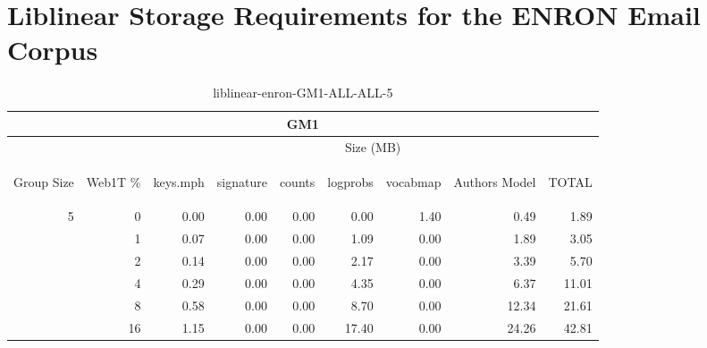 \chapter{Liblinear Storage Requirements for the ENRON Email Corpus}

\begin{center}
\begin{table}[htbp] 
 \begin{center}
\begin{tabular}{ | r | r | r | r | r | r | r | r | r |}
\hline
\multicolumn{9}{|c|}{GM1}\\
\hline
 & & \multicolumn{7}{|c|}{Size (MB)}\\ \cline{3-9}
\begin{sideways}Group Size\end{sideways} & \begin{sideways}Web1T \% \end{sideways} & \begin{sideways}keys.mph\end{sideways} & \begin{sideways}signature\end{sideways} & \begin{sideways}counts\end{sideways} & \begin{sideways}logprobs\end{sideways} & \begin{sideways}vocabmap\end{sideways} & \begin{sideways}Authors Model \end{sideways} & \begin{sideways}TOTAL\end{sideways}\\
\hline
\multirow{5}{*}{5}
 & 0 & 0.00 & 0.00 & 0.00 & 0.00 & 1.40 & 0.49 & 1.89\\ \cline{2-9}
 & 1 & 0.07 & 0.00 & 0.00 & 1.09 & 0.00 & 1.89 & 3.05\\ \cline{2-9}
 & 2 & 0.14 & 0.00 & 0.00 & 2.17 & 0.00 & 3.39 & 5.70\\ \cline{2-9}
 & 4 & 0.29 & 0.00 & 0.00 & 4.35 & 0.00 & 6.37 & 11.01\\ \cline{2-9}
 & 8 & 0.58 & 0.00 & 0.00 & 8.70 & 0.00 & 12.34 & 21.61\\ \cline{2-9}
 & 16 & 1.15 & 0.00 & 0.00 & 17.40 & 0.00 & 24.26 & 42.81\\ \cline{2-9}
\hline
\end{tabular}
\caption{liblinear-enron-GM1-ALL-ALL-5}
\label{table:liblinear-enron-GM1-ALL-ALL-5}
\end{center}
 \end{table}
\end{center}

